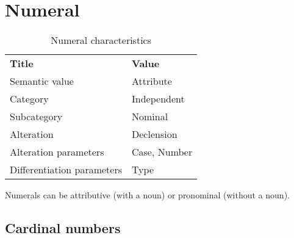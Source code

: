 \section{Numeral}

\begin{table}[h]
	\caption{Numeral characteristics}
	\begin{tabular}{ll}
		\textbf{Title}              & \textbf{Value}      \\
		Semantic value              & Attribute           \\
		Category                    & Independent         \\
		Subcategory                 & Nominal             \\
		Alteration                  & Declension          \\
		Alteration parameters       & Case, Number        \\
		Differentiation parameters  & Type
	\end{tabular}
\end{table}

Numerals can be attributive (with a noun) or pronominal (without a noun).
	
\subsection{Cardinal numbers}

